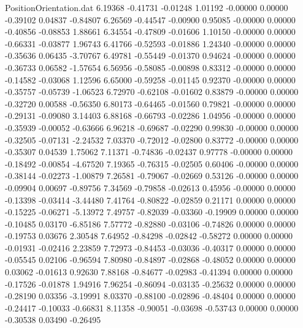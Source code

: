 \begin{filecontents}{PositionOrientation.dat}
   6.19368   -0.41731   -0.01248     1.01192   -0.00000    0.00000   -0.39102    0.04837   -0.84807
   6.26569   -0.44547   -0.00900     0.95085   -0.00000    0.00000   -0.40856   -0.08853    1.88661
   6.34554   -0.47809   -0.01606     1.10150   -0.00000    0.00000   -0.66331   -0.03877    1.96743
   6.41766   -0.52593   -0.01886     1.24340   -0.00000    0.00000   -0.35636    0.06435   -3.70767
   6.49781   -0.55449   -0.01370     0.94624   -0.00000    0.00000   -0.36733    0.06582   -1.57654
   6.56956   -0.58085   -0.00898     0.83312   -0.00000    0.00000   -0.14582   -0.03068    1.12596
   6.65000   -0.59258   -0.01145     0.92370   -0.00000    0.00000   -0.35757   -0.05739   -1.06523
   6.72970   -0.62108   -0.01602     0.83879   -0.00000    0.00000   -0.32720    0.00588   -0.56350
   6.80173   -0.64465   -0.01560     0.79821   -0.00000    0.00000   -0.29131   -0.09080    3.14403
   6.88168   -0.66793   -0.02286     1.04956   -0.00000    0.00000   -0.35939   -0.00052   -0.63666
   6.96218   -0.69687   -0.02290     0.99830   -0.00000    0.00000   -0.32505   -0.07131   -2.24532
   7.03370   -0.72012   -0.02800     0.83772   -0.00000    0.00000   -0.35307    0.04539    1.75062
   7.11371   -0.74836   -0.02437     0.97778   -0.00000    0.00000   -0.18492   -0.00854   -4.67520
   7.19365   -0.76315   -0.02505     0.60406   -0.00000    0.00000   -0.38144   -0.02273   -1.00879
   7.26581   -0.79067   -0.02669     0.53126   -0.00000    0.00000   -0.09904    0.00697   -0.89756
   7.34569   -0.79858   -0.02613     0.45956   -0.00000    0.00000   -0.13398   -0.03414   -3.44480
   7.41764   -0.80822   -0.02859     0.21171    0.00000    0.00000   -0.15225   -0.06271   -5.13972
   7.49757   -0.82039   -0.03360    -0.19909    0.00000    0.00000   -0.10485    0.03170   -6.85186
   7.57772   -0.82880   -0.03106    -0.74826    0.00000    0.00000   -0.19753    0.03676    2.30548
   7.64952   -0.84298   -0.02842    -0.58272    0.00000    0.00000   -0.01931   -0.02416    2.23859
   7.72973   -0.84453   -0.03036    -0.40317    0.00000    0.00000   -0.05545    0.02106   -0.96594
   7.80980   -0.84897   -0.02868    -0.48052    0.00000    0.00000    0.03062   -0.01613    0.92630
   7.88168   -0.84677   -0.02983    -0.41394    0.00000    0.00000   -0.17526   -0.01878    1.94916
   7.96254   -0.86094   -0.03135    -0.25632    0.00000    0.00000   -0.28190    0.03356   -3.19991
   8.03370   -0.88100   -0.02896    -0.48404    0.00000    0.00000   -0.24417   -0.10033   -0.66831
   8.11358   -0.90051   -0.03698    -0.53743    0.00000    0.00000   -0.30538    0.03490   -0.26495

\end{filecontents}
